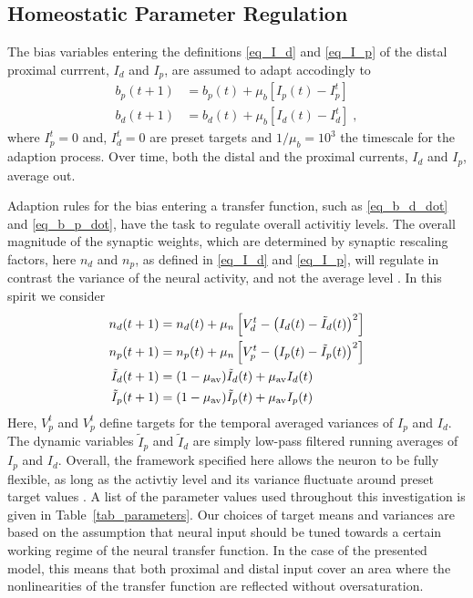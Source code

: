 \documentclass[utf8]{frontiersSCNS} %
\begin{document}
\subsection{Homeostatic Parameter Regulation\label{sect_homeostasis}}

The bias variables entering the definitions
\eqref{eq_I_d} and \eqref{eq_I_p} of the distal
proximal currrent, $I_d$ and $I_p$, 
are assumed to adapt accodingly to
\begin{align}
\label{eq_b_p_dot}
b_p(t+1) &= b_p(t) + \mu_b \left[I_p(t) - I_p^t\right] \\
b_d(t+1) &= b_d(t) + \mu_b \left[I_d(t) - I_d^t\right] \;,
\label{eq_b_d_dot}
\end{align}
where $I_p^t=0$ and, $I_d^t=0$
are preset targets and $1/\mu_b=10^3$ the
timescale for the adaption process. Over
time, both the distal and the proximal 
currents, $I_d$ and $I_p$, average out.

Adaption rules for the bias entering a 
transfer function, such as
\eqref{eq_b_d_dot} and \eqref{eq_b_p_dot},
have the task to regulate overall activitiy
levels. The overall magnitude of the
synaptic weights, which are determined by 
synaptic rescaling factors, here $n_d$ and $n_p$, 
as defined in \eqref{eq_I_d} and \eqref{eq_I_p},
will regulate in contrast the variance of
the neural activity, and not the average
level \citep{schubert2021local}. In this
spirit we consider
\begin{align}
n_d(t+1) &= n_d(t) + 
\mu_n \left[V_d^t - \left( I_d(t) - \tilde{I}_d(t)\right)^2\right] \\
n_p(t+1) &= n_p(t) + 
\mu_n \left[V_p^t - \left( I_p(t) - \tilde{I}_p(t)\right)^2\right] \\
\tilde{I}_d(t+1) &= (1-\mu_{\rm av})\tilde{I}_d(t) + \mu_{\rm av} I_d(t) \\
\tilde{I}_p(t+1) &= (1-\mu_{\rm av})\tilde{I}_p(t) + \mu_{\rm av} I_p(t) 
\end{align}
Here, $V_p^t$ and $V_p^t$ define targets for 
the temporal averaged variances of $I_p$ 
and $I_d$.  
The dynamic variables $\tilde{I}_p$ and $\tilde{I}_d$ 
are simply low-pass filtered running averages of 
$I_p$ and $I_d$. Overall, the framework
specified here allows the neuron to be fully flexible,
as long as the activtiy level and its variance 
fluctuate around preset target values 
\citep{schubert2021local}. A list of 
the parameter values used throughout this investigation 
is given in Table~\ref{tab_parameters}. Our choices of
target means and variances are based on the assumption
that neural input should be tuned towards a certain
working regime of the neural transfer function. In
the case of the presented model, this means that both
proximal and distal input cover an area where the nonlinearities
of the transfer function are reflected without oversaturation.
\end{document}
